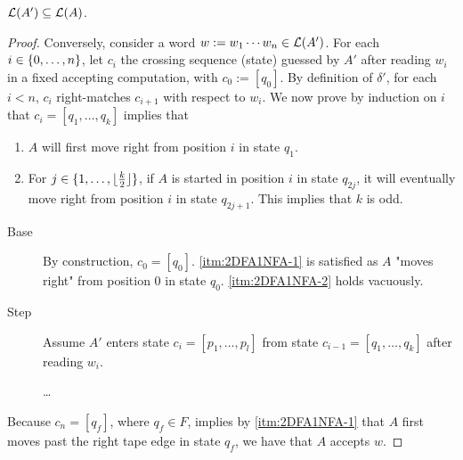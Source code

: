 \begin{lemm}\label{lem:2DFAto1NFA-2}
	$\mathcal L(A')\subseteq\mathcal L(A)$.
\end{lemm}
\begin{proof}
	Conversely, consider a word $w:=w_1\cdots w_n\in\mathcal L(A')$.
	For each $i\in\{0,\dots,n\}$, let $c_i$ the crossing sequence (state) guessed by $A'$ after reading $w_i$ in a fixed accepting computation, with $c_0:=[q_0]$.
	By definition of $\delta'$, for each $i<n$, $c_i$ right-matches $c_{i+1}$ with respect to $w_i$.
	We now prove by induction on $i$ that $c_i=[q_1,\dots,q_k]$ implies that
	\begin{enumerate}[(1)]
		\item \label{itm:2DFA1NFA-1} $A$ will first move right from position $i$ in state $q_1$.
		\item \label{itm:2DFA1NFA-2} For $j\in\{1,\dots,\lfloor \frac{k}{2} \rfloor\}$, if $A$ is started in position $i$ in state $q_{2j}$, it will eventually move right from position $i$ in state $q_{2j+1}$. This implies that $k$ is odd.
	\end{enumerate}

	\begin{description}
		\item[Base] By construction, $c_0=[q_0]$. \ref{itm:2DFA1NFA-1} is satisfied as $A$ "moves right" from position $0$ in state $q_0$. \ref{itm:2DFA1NFA-2} holds vacuously.
		\item[Step] Assume $A'$ enters state $c_i=[p_1,\dots,p_l]$ from state $c_{i-1}=[q_1,\dots,q_k]$ after reading $w_i$.

		      \dots
	\end{description}

	Because $c_n=[q_f]$, where $q_f\in F$, implies by \ref{itm:2DFA1NFA-1} that $A$ first moves past the right tape edge in state $q_f$, we have that $A$ accepts $w$.
\end{proof}

